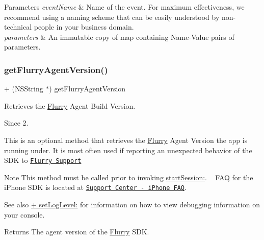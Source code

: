 \begin{DoxyParams}{Parameters}
{\em event\+Name} & Name of the event. For maximum effectiveness, we recommend using a naming scheme that can be easily understood by non-\/technical people in your business domain. \\
\hline
{\em parameters} & An immutable copy of map containing Name-\/\+Value pairs of parameters. \\
\hline
\end{DoxyParams}
\mbox{\label{interfaceFlurry_a7bb5278edece8dd7d97ebd5ccedb68cf}} 
\subsubsection{\texorpdfstring{get\+Flurry\+Agent\+Version()}{getFlurryAgentVersion()}}
{\footnotesize\ttfamily + (N\+S\+String $\ast$) get\+Flurry\+Agent\+Version \begin{DoxyParamCaption}{ }\end{DoxyParamCaption}}



Retrieves the \hyperlink{interfaceFlurry}{Flurry} Agent Build Version. 

\begin{DoxySince}{Since}
2.
\end{DoxySince}
This is an optional method that retrieves the \hyperlink{interfaceFlurry}{Flurry} Agent Version the app is running under. It is most often used if reporting an unexpected behavior of the S\+DK to \href{mailto:iphonesupport@flurry.com}{\tt Flurry Support}

\begin{DoxyNote}{Note}
This method must be called prior to invoking \hyperlink{interfaceFlurry_aeadfa23545c392ffd46db448b6a95809}{start\+Session\+:}. ~\newline
F\+AQ for the i\+Phone S\+DK is located at \href{http://wiki.flurry.com/index.php?title=IPhone_FAQ}{\tt Support Center -\/ i\+Phone F\+AQ}.
\end{DoxyNote}
\begin{DoxySeeAlso}{See also}
\hyperlink{interfaceFlurry_ab717465e705b23c80253dddae321f5bc}{+ set\+Log\+Level\+:} for information on how to view debugging information on your console.
\end{DoxySeeAlso}
\begin{DoxyReturn}{Returns}
The agent version of the \hyperlink{interfaceFlurry}{Flurry} S\+DK. 
\end{DoxyReturn}
\mbox{\label{interfaceFlurry_a6289ab504ab08ed9249fe5ef56eef646}} 
